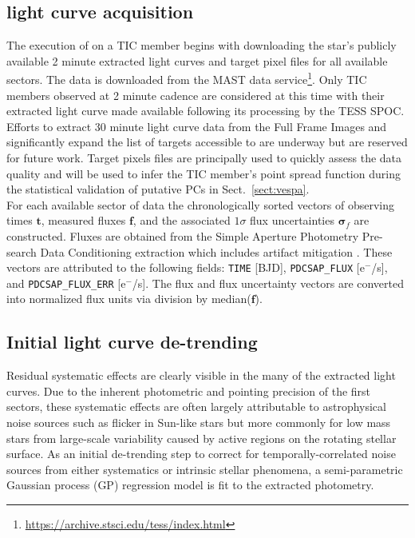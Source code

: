 \subsection{\tess{} light curve acquisition}
The execution of \pipeline{} on a TIC member begins with downloading the star's publicly available
2 minute \tess{} extracted light curves and target pixel files for all available sectors. 
The \tess{} data is downloaded from the MAST data service\footnote{\url{https://archive.stsci.edu/tess/index.html}}.
Only TIC members observed at 2 minute cadence are considered at this time with their extracted light curve made available
following its processing by the TESS SPOC. Efforts to extract 30 minute light
curve data from the \tess{} Full Frame Images and significantly expand the list of \tess{} targets accessible to
\pipeline{} are underway but are reserved for future work.
Target pixels files are principally used to quickly assess the data quality and will be used to
infer the TIC member's point spread function during the statistical validation of putative PCs in Sect.~\ref{sect:vespa}. \\

For each available sector of data the chronologically sorted vectors of observing times $\mathbf{t}$,
measured fluxes $\mathbf{f}$, and the associated $1\sigma$ flux
uncertainties $\boldsymbol{\sigma}_{f}$ are constructed. Fluxes are obtained from the Simple Aperture Photometry Pre-search
Data Conditioning extraction which includes artifact mitigation \citep{smith12}. These vectors are
attributed to the following fields: \texttt{TIME} [BJD], \texttt{PDCSAP\_FLUX} [e$^-$/s], and
\texttt{PDCSAP\_FLUX\_ERR} [e$^-$/s]. The flux and flux uncertainty vectors are converted into normalized
flux units via division by median($\mathbf{f}$).

\subsection{Initial light curve de-trending} \label{sect:detrend}
Residual systematic effects are clearly visible in the many of the extracted light curves. Due to the
inherent photometric and pointing precision of the first \tess{} sectors, these systematic effects
are often largely attributable to astrophysical noise sources such as flicker \citep{bastien13} in
Sun-like stars but more commonly for low mass stars from
large-scale variability caused by active regions on the rotating stellar surface. As an initial de-trending step
to correct for temporally-correlated noise sources from either systematics or intrinsic stellar phenomena,
a semi-parametric Gaussian process (GP) regression model is fit to the extracted \tess{} photometry. \\

